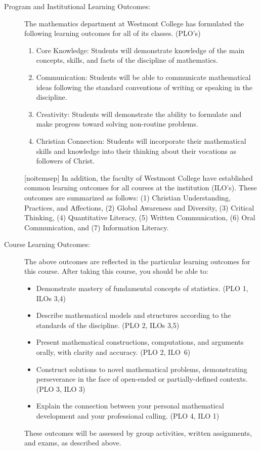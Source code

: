 \documentclass[
  twoside]{article}
\begin{document}
\begin{description}
\item[Program and Institutional Learning Outcomes:] The
         mathematics department at Westmont College has formulated the
         following learning outcomes for all of its classes. (PLO's)
\begin{enumerate}[noitemsep]
\item Core Knowledge: Students will demonstrate knowledge of the
                  main concepts, skills, and facts of the discipline of
                  mathematics.
\item Communication: Students will be able to communicate mathematical ideas
     following the standard conventions of writing or speaking in the
     discipline.
\item Creativity: Students will demonstrate the ability to formulate and make
     progress toward solving non-routine problems.
\item Christian Connection: Students will incorporate their mathematical skills
     and knowledge into their thinking about their vocations as followers of
     Christ.
         \end{enumerate}[noitemsep]
         In addition, the faculty of Westmont College have established common
         learning outcomes for all courses at the institution
         (ILO's). These outcomes are summarized as follows:
(1) Christian Understanding, Practices, and Affections,
(2) Global Awareness and Diversity,
(3) Critical Thinking,
(4) Quantitative Literacy,
(5) Written Communication,
(6) Oral Communication, and
(7) Information Literacy.

\item[Course Learning Outcomes:] The above outcomes are reflected in the
     particular learning outcomes for this course.
     After taking this course, you should be able
     to:
    \begin{itemize}[noitemsep]
        \item Demonstrate mastery of fundamental concepts of statistics. (PLO 1, ILOs 3,4)
        \item Describe mathematical models and structures according to the
             standards of the discipline. (PLO 2,
              ILOs 3,5)
        \item Present mathematical constructions, computations, and arguments orally, with
              clarity and accuracy. (PLO 2, ILO~6)
        \item Construct solutions to novel mathematical problems,
               demonstrating perseverance in the face of open-ended or
               partially-defined contexts. (PLO 3, ILO 3)
        \item Explain the connection between your personal mathematical
             development and your professional calling. (PLO 4, ILO
             1)
    \end{itemize}
These outcomes will be assessed by group activities, written assignments, and exams, as described above.

\end{description}
\end{document}
